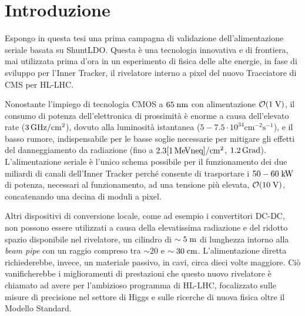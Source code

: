 \chapter{Introduzione}

Espongo in questa tesi una prima campagna di validazione dell'alimentazione seriale basata su ShuntLDO. Questa \`e una tecnologia innovativa e di frontiera, mai utilizzata prima d'ora in un esperimento di fisica delle alte energie, in fase di sviluppo per l'Inner Tracker, il rivelatore interno a pixel del nuovo Tracciatore di CMS per HL-LHC. 

Nonostante l'impiego di tecnologia CMOS a $65\rm \; nm$ con alimentazione ${\cal O}(1\rm \; V)$, il consumo di potenza dell'elettronica di prossimit\`a \`e enorme a causa dell'elevato rate ($3{\rm \, GHz}/\mathrm{cm^2}$), dovuto alla luminosit\`a istantanea ($\mathrm{5-7.5\cdot 10^{34}cm^{-2}s^{-1}}$), e il basso rumore, indispensabile per le basse soglie necessarie per mitigare gli effetti del danneggiamento da radiazione (fino a $\mathrm{2.3 [1{\rm \, Me\kern-0.125em V} neq]/cm^2}$, $1.2{\rm \, Grad}$). L'alimentazione seriale \`e l'unico schema possibile per il funzionamento dei due miliardi di canali dell'Inner Tracker perché consente di trasportare i $50-60\rm \; kW$ di potenza, necessari al funzionamento, ad una tensione pi\`u elevata, ${\cal O}(10\rm \; V)$, concatenando una decina di moduli a pixel.


Altri dispositivi di conversione locale, come ad esempio i convertitori DC-DC,
non possono essere utilizzati a causa della elevatissima radiazione e del ridotto spazio disponibile nel rivelatore, un cilindro di $\sim5\rm \; m$ di lunghezza intorno alla \textit{beam pipe} con un raggio compreso tra $\sim20$ e $\sim 30\rm \; cm$. L'alimentazione diretta richiederebbe, invece, un materiale passivo, in cavi, circa dieci volte maggiore. 
Ciò vanificherebbe i miglioramenti di prestazioni che questo nuovo rivelatore \`e chiamato ad avere per l'ambizioso programma di HL-LHC, focalizzato sulle misure di precisione nel settore di Higgs e sulle ricerche di nuova fisica oltre il Modello Standard. 


